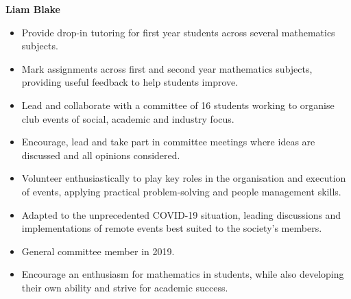 \documentclass[11pt,a4paper,academicons]{altacv}
\begin{document}
%
\begin{fullwidth}
	\color{emphasis}%
	{\fontsize{24pt}{24pt}\selectfont\bfseries{Liam Blake}}

	\divider


	\begin{itemize}
		\item Provide drop-in tutoring for first year students across several mathematics subjects.

		\item Mark assignments across first and second year mathematics subjects, providing useful feedback to help students improve.

	\end{itemize}

	\divider

	\begin{itemize}
		\item Lead and collaborate with a committee of 16 students working to organise club events of social, academic and industry focus.

		\item Encourage, lead and take part in committee meetings where ideas are discussed and all opinions considered.

		\item Volunteer enthusiastically to play key roles in the organisation and execution of events, applying practical problem-solving and people management skills.

		\item Adapted to the unprecedented COVID-19 situation, leading discussions and implementations of remote events best suited to the society's members.

		\item General committee member in 2019.
	\end{itemize}


	\divider

	\begin{itemize}
		\item Encourage an enthusiasm for mathematics in students, while also developing their own ability and strive for academic success.


\end{itemize}
\end{fullwidth}
\end{document}
